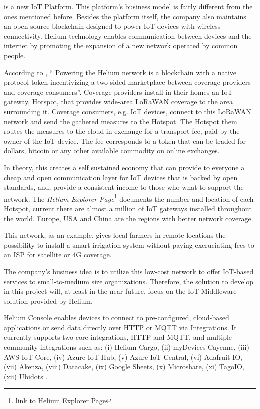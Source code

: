  is a new \gls{IoT} Platform. This platform's business model is fairly different from the ones mentioned before. Besides the platform itself, the company also maintains an open-source blockchain designed to power \gls{IoT} devices with wireless connectivity. Helium technology enables communication between devices and the internet by promoting the expansion of a new network operated by common people.

According to \cite{helium-wp}, `` Powering the Helium network is a blockchain with a native protocol token incentivizing a two-sided marketplace between coverage providers and coverage consumers''. Coverage providers install in their homes an \gls{IoT} gateway, Hotspot, that provides wide-area LoRaWAN coverage to the area surrounding it. Coverage consumers, e.g. \gls{IoT} devices, connect to this LoRaWAN network and send the gathered measures to the Hotspot. The Hotspot them routes the measures to the cloud in exchange for a transport fee, paid by the owner of the \gls{IoT} device.
The fee corresponds to a token that can be traded for dollars, bitcoin or any other available commodity on online exchanges.

In theory, this creates a self sustained economy that can provide to everyone a cheap and open communication layer for \gls{IoT} devices that is backed by open standards, and, provide a consistent income to those who what to support the network. The \textit{Helium Explorer Page}\footnote{\href {https://explorer.helium.com/}{link to Helium Explorer Page}} documents the number and location of each Hotspot, current there are almost a million of \gls{IoT} gateways installed throughout the world. Europe, USA and China are the regions with better network coverage.

This network, as an example, gives local farmers in remote locations the possibility to install a smart irrigation system without paying excruciating fees to an \gls{ISP} for satellite or 4G coverage.

The company's business idea is to utilize this low-cost network to offer \gls{IoT}-based services to small-to-medium size organizations.
Therefore, the solution to develop in this project will, at least in the near future, focus on the \gls{IoT} Middleware solution provided by Helium.

Helium Console enables devices to connect to pre-configured, cloud-based applications or send data directly over HTTP or MQTT via Integrations.
It currently supports two core integrations, HTTP and \gls{MQTT}, and multiple community integrations such as: (i) Helium Cargo, (ii) myDevices Cayenne, (iii) AWS IoT Core, (iv) Azure IoT Hub, (v) Azure IoT Central, (vi) Adafruit IO, (vii) Akenza, (viii) Datacake, (ix) Google Sheets, (x) Microshare, (xi) TagoIO, (xii) Ubidots \parencite{helium-integrations}. 

